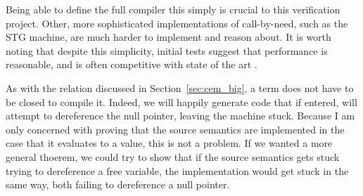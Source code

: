 Being able to define the full compiler this simply is crucial to this
verification project. Other, more sophisticated implementations of call-by-need,
such as the STG machine, are much harder to implement and reason about. It is
worth noting that despite this simplicity, initial tests suggest that performance
is reasonable, and is often competitive with state of the art \cite{cem}.

As with the relation discussed in Section~\ref{sec:cem_big}, a term does not
have to be closed to compile it. Indeed, we will happily generate code that if
entered, will attempt to dereference the null pointer, leaving the machine
stuck. Because I am only concerned with proving that the source semantics are
implemented in the case that it evaluates to a value, this is not a problem. If
we wanted a more general thoerem, we could try to show that if the source
semantics gets stuck trying to dereference a free variable, the implementation
would get stuck in the same way, both failing to dereference a null pointer.  
